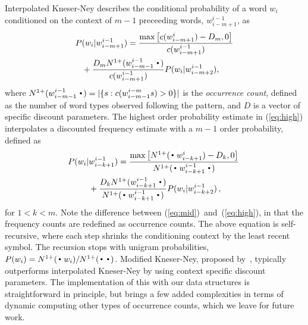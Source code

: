 Interpolated Kneser-Ney describes the conditional probability of a word $w_i$ conditioned on the context of $m-1$ preceeding words, $w_{i-m+1}^{i-1}$, as 
\begin{align}
P(w_i |& w_{i-m+1}^{i-1})=\frac{\max\left[c(w^{i}_{i-m+1}) - D_m,0\right]}{c(w^{i-1}_{i-m+1})} \nonumber \\
& \hspace{-6mm} +\frac{D_m \nlplus{w^{i-1}_{i-m-1}\Bigcdot} }{c(w^{i-1}_{i-m+1})}  P(w_i | w_{i-m+2}^{i-1}) ,  
\label{eq:high}
\end{align}
where \mbox{$\nlplus{w^{i-1}_{i-m-1}\Bigcdot} = |\{s: c(w^{i-m}_{i-m-1}s)>0\}|$} is the \emph{occurrence count}, defined as the number of word types observed following the pattern, and $D$ is a vector of \ngram specific discount parameters.
The highest order probability estimate in (\ref{eq:high}) interpolates a discounted frequency estimate with a $m-1$ order probability, defined as 
\begin{align}
\! P(w_i |& w_{i-k+1}^{i-1})
 = \frac{\max\left[\nlplus{\Bigcdot w_{i-k+1}^{i}} - D_k,0\right]}{\nlplus{\Bigcdot w_{i-k+1}^{i-1} \Bigcdot}} \nonumber \\
&+ \frac{D_k \nlplus{w_{i-k+1}^{i-1}\Bigcdot}}{\nlplus{\Bigcdot w_{i-k+1}^{i-1} \Bigcdot}} P(w_i | w_{i-k+2}^{i-1}) \, , \! \label{eq:mid}
\end{align}
for $1<k<m$. 
Note the difference between (\ref{eq:mid})~and~(\ref{eq:high}), in that the frequency counts are redefined as occurrence counts. 
The above equation is self-recursive, where each step shrinks the conditioning context by the least recent symbol. 
The recursion stops with unigram probabilities,
%
$ P(w_i) = \nlplus{\Bigcdot w_i} / \nlplus{\Bigcdot\Bigcdot}$.
Modified Kneser-Ney, proposed by~, typically outperforms interpolated Kneser-Ney by using context specific discount parameters.
The implementation of this with our data structures is straightforward in principle, but brings a few added complexities in terms of dynamic computing other types of occurrence counts, which we leave for future work.


